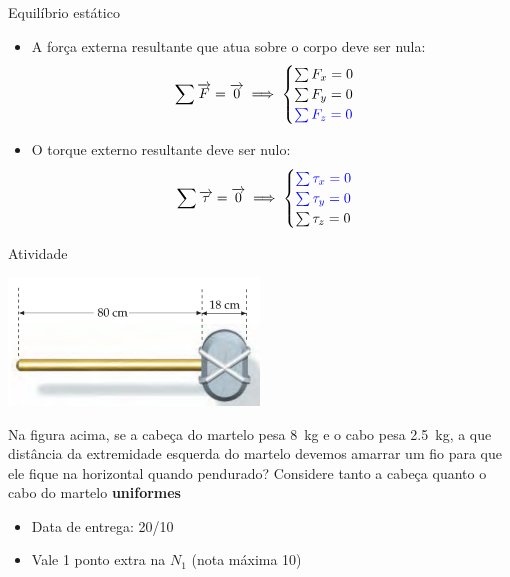 \begin{frame}{Equilíbrio estático}
    \begin{itemize}[<+->]
        \item A força externa resultante que atua sobre o corpo deve ser nula:
            \[
                \sum \vec{F}=\vec{0} \implies
                \begin{cases}
                    \sum F_x =0 \\ \sum F_y =0 \\ \textcolor{blue}{\sum F_z =0}
                \end{cases}
            \]

        \item O torque externo resultante deve ser nulo:
            \[
                \sum \vec{\tau}=\vec{0} \implies
                \begin{cases}
                    \textcolor{blue}{\sum \tau_x =0} \\
                    \textcolor{blue}{\sum \tau_y =0} \\
                    \sum \tau_z =0
                \end{cases}
            \]
    \end{itemize}
\end{frame}

\begin{frame}{Atividade}
    \begin{center}
        \includegraphics[width=0.5\textwidth]{images/thor}
    \end{center}
    Na figura acima, se a cabeça do martelo pesa \SI{8}{kg} e o cabo pesa \SI{2.5}{kg}, a que distância da extremidade
    esquerda do martelo devemos amarrar um fio para que ele fique na horizontal quando pendurado? Considere tanto
    a cabeça quanto o cabo do martelo \textbf{uniformes}

    \pause

    \begin{itemize}
        \item Data de entrega: 20/10
        \item Vale 1 ponto extra na \(N_1\) (nota máxima 10)
    \end{itemize}
\end{frame}

